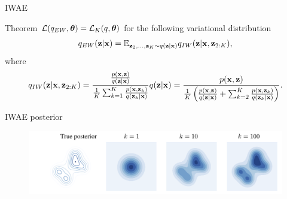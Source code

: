 \begin{frame}{IWAE}
	\begin{block}{Theorem}
		$\mathcal{L}(q_{EW}, \boldsymbol{\theta}) = \mathcal{L}_K(q, \boldsymbol{\theta})$
		for the following variational distribution
		\[
		q_{EW}(\mathbf{z} | \mathbf{x}) = \mathbb{E}_{\mathbf{z}_2, \dots, \mathbf{z}_K \sim q(\mathbf{z} | \mathbf{x})} q_{IW}(\mathbf{z} | \mathbf{x}, \mathbf{z}_{2:K}),
		\]
		where
		\vspace{-0.6cm}
		\[
			q_{IW}(\mathbf{z} | \mathbf{x}, \mathbf{z}_{2:K}) = \frac{\frac{p(\mathbf{x}, \mathbf{z})}{q(\mathbf{z} | \mathbf{x})}}{\frac{1}{K} \sum_{k=1}^K \frac{p(\mathbf{x}, \mathbf{z}_k)}{q(\mathbf{z}_k | \mathbf{x})}} q(\mathbf{z} | \mathbf{x}) = \frac{p(\mathbf{x}, \mathbf{z})}{\frac{1}{K}\left( \frac{p(\mathbf{x}, \mathbf{z})}{q(\mathbf{z} | \mathbf{x})} + \sum_{k=2}^K \frac{p(\mathbf{x}, \mathbf{z}_k)}{q(\mathbf{z}_k | \mathbf{x})}\right)}.
		\]
	\end{block}
	\vspace{-0.5cm}
	\begin{block}{IWAE posterior}
		\vspace{-0.3cm}
		\begin{figure}
			\centering
			\includegraphics[width=\linewidth]{figs/IWAE_1.png}
		\end{figure}
	\end{block}

\end{frame}

